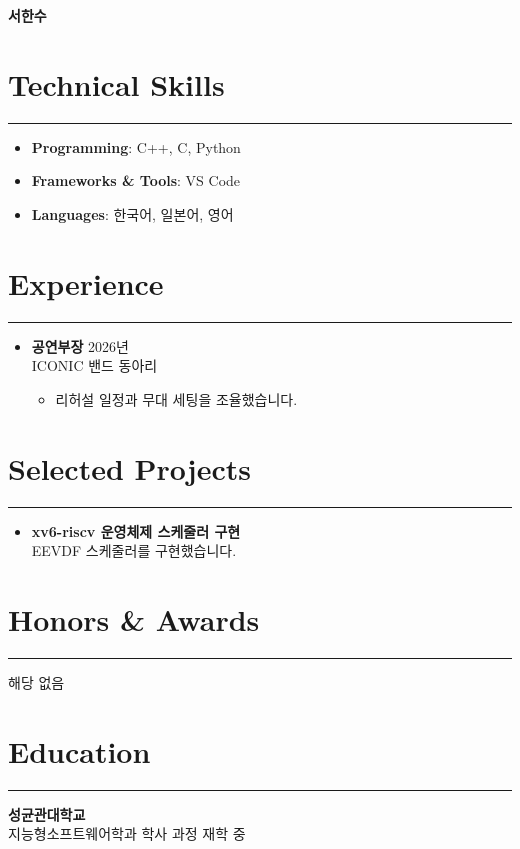 \documentclass[letterpaper,10pt]{article}
\begin{document}
\begin{center}
    \textbf{\LARGE 서한수}
\end{center}

\section*{Technical Skills}
\hrule
\vspace{4pt}
\begin{itemize}
    \item[] \textbf{Programming}: C++, C, Python
    \item[] \textbf{Frameworks \& Tools}: VS Code
    \item[] \textbf{Languages}: 한국어, 일본어, 영어
\end{itemize}

\section*{Experience}
\hrule
\vspace{4pt}
\begin{itemize}
    \item[] \textbf{공연부장} \hfill 2026년 \\
    ICONIC 밴드 동아리
    \begin{itemize}
        \item 리허설 일정과 무대 세팅을 조율했습니다.
    \end{itemize}
\end{itemize}

\section*{Selected Projects}
\hrule
\vspace{4pt}
\begin{itemize}
    \item \textbf{xv6-riscv 운영체제 스케줄러 구현} \\
    EEVDF 스케줄러를 구현했습니다.
\end{itemize}

\section*{Honors \& Awards}
\hrule
\vspace{4pt}
\noindent 해당 없음

\section*{Education}
\hrule
\vspace{4pt}
\noindent \textbf{성균관대학교} \\
지능형소프트웨어학과 학사 과정 재학 중
\end{document}
